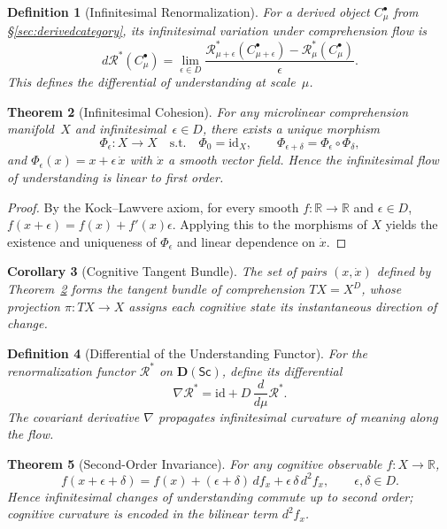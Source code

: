 \documentclass[12pt,a4paper,twoside,openright]{book}
\newtheorem{theorem}{Theorem}
\newtheorem{definition}[theorem]{Definition}
\newtheorem{corollary}[theorem]{Corollary}
\begin{document}
\begin{definition}[Infinitesimal Renormalization]
For a derived object $C_\mu^\bullet$ from §\ref{sec:derivedcategory},
its infinitesimal variation under comprehension flow is
\[
d\mathcal{R}^\ast(C_\mu^\bullet)
=\lim_{\epsilon\in D}
\frac{\mathcal{R}^\ast_{\mu+\epsilon}(C_{\mu+\epsilon}^\bullet)
 -\mathcal{R}^\ast_\mu(C_\mu^\bullet)}{\epsilon}.
\]
This defines the \emph{differential of understanding} at scale~$\mu$.
\end{definition}

\begin{theorem}[Infinitesimal Cohesion]
\label{thm:microcohesion}
For any microlinear comprehension manifold~$X$
and infinitesimal~$\epsilon\!\in\!D$,
there exists a unique morphism
\[
\Phi_\epsilon:X\longrightarrow X
\quad\text{s.t.}\quad
\Phi_0=\mathrm{id}_X,\qquad
\Phi_{\epsilon+\delta}=\Phi_\epsilon\circ\Phi_\delta,
\]
and
\(
\Phi_\epsilon(x)=x+\epsilon\,\dot{x}
\)
with $\dot{x}$ a smooth vector field.
Hence the infinitesimal flow of understanding is linear to first order.
\end{theorem}

\begin{proof}
By the Kock–Lawvere axiom,
for every smooth $f:\mathbb{R}\to\mathbb{R}$ and $\epsilon\in D$,
$f(x+\epsilon)=f(x)+f'(x)\epsilon$.
Applying this to the morphisms of $X$
yields the existence and uniqueness of $\Phi_\epsilon$
and linear dependence on $\dot{x}$.
\end{proof}

\begin{corollary}[Cognitive Tangent Bundle]
The set of pairs $(x,\dot{x})$ defined by Theorem~\ref{thm:microcohesion}
forms the \emph{tangent bundle of comprehension}
\(
T\!X = X^D
\),
whose projection $\pi:T\!X\to X$
assigns each cognitive state its instantaneous direction of change.
\end{corollary}

\begin{definition}[Differential of the Understanding Functor]
For the renormalization functor $\mathcal{R}^\ast$
on $\mathbf{D}(\mathsf{Sc})$,
define its differential
\[
\nabla\mathcal{R}^\ast
=
\mathrm{id}
+
D\,\frac{d}{d\mu}\mathcal{R}^\ast.
\]
The covariant derivative $\nabla$
propagates infinitesimal curvature of meaning along the flow.
\end{definition}

\begin{theorem}[Second-Order Invariance]
For any cognitive observable $f:X\to\mathbb{R}$,
\[
f(x+\epsilon+\delta)
=f(x)
+(\epsilon+\delta)\,df_x
+\epsilon\,\delta\,d^2f_x,
\qquad
\epsilon,\delta\in D.
\]
Hence infinitesimal changes of understanding commute up to
second order; cognitive curvature is encoded in the bilinear term $d^2f_x$.
\end{theorem}
\end{document}
